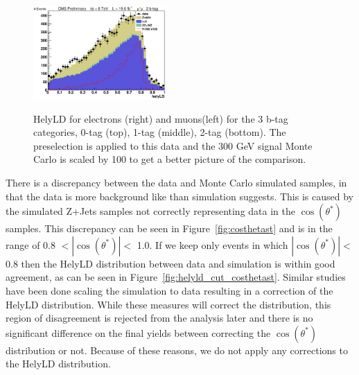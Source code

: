 \begin{figure}[htb!]
\begin{center}
{\includegraphics[width=0.45\textwidth]{presentation/defense/images/preselection/2/mu/helyLD.eps}
}
\caption{
HelyLD for electrons (right) and muons(left) for the 3 b-tag categories, 0-tag (top), 1-tag (middle), 2-tag (bottom). The preselection is applied to this data and the 300 GeV signal Monte Carlo is scaled by 100 to get a better picture of the comparison.
}
\label{fig:hely_LD}
\end{center}
\end{figure}


There is a discrepancy between the data and Monte Carlo simulated samples, in that the data is more background like than simulation suggests. This is caused by the simulated Z+Jets samples not correctly representing data in the $\cos(\theta^*)$ samples.  This discrepancy can be seen in Figure~\ref{fig:costhetast} and is in the range of 0.8 $< |\cos(\theta^*)| <$ 1.0.  If we keep only events in which $|\cos(\theta^*)| <$ 0.8 then the HelyLD distribution between data and simulation is within good agreement, as can be seen in Figure~\ref{fig:helyld_cut_costhetast}.  Similar studies have been done scaling the simulation to data resulting in a correction of the HelyLD distribution.  While these measures will correct the distribution, this region of disagreement is rejected from the analysis later and there is no significant difference on the final yields between correcting the $\cos(\theta^*)$ distribution or not. Because of these reasons, we do not apply any corrections to the HelyLD distribution.


